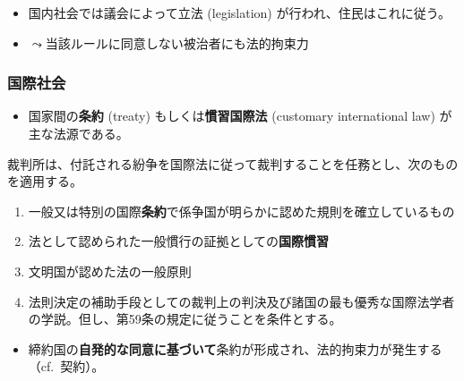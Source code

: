 \documentclass[
  xelatex,
  ja=standard]{bxjsarticle}
\providecommand{\tightlist}{%
  \setlength{\itemsep}{0pt}\setlength{\parskip}{0pt}}\usepackage{longtable,booktabs,array}
\begin{document}
\begin{itemize}
\tightlist
\item
  国内社会では議会によって立法 (legislation)
  が行われ、住民はこれに従う。
\item
  \(\leadsto\)当該ルールに同意しない被治者にも法的拘束力
\end{itemize}

\hypertarget{ux56fdux969bux793eux4f1a}{%
\subsubsection{国際社会}\label{ux56fdux969bux793eux4f1a}}

\begin{itemize}
\tightlist
\item
  国家間の\textbf{条約} (treaty) もしくは\textbf{慣習国際法} (customary
  international law) が主な法源である。
\end{itemize}

\begin{tcolorbox}[enhanced jigsaw, titlerule=0mm, leftrule=.75mm, toprule=.15mm, title=\textcolor{quarto-callout-note-color}{\faInfo}\hspace{0.5em}{\href{https://www.unic.or.jp/info/un/un_organization/icj/statute/}{国際司法裁判所規程}　第38条1項}, left=2mm, colbacktitle=quarto-callout-note-color!10!white, rightrule=.15mm, opacitybacktitle=0.6, colframe=quarto-callout-note-color-frame, breakable, coltitle=black, opacityback=0, bottomrule=.15mm, colback=white, bottomtitle=1mm, toptitle=1mm, arc=.35mm]

裁判所は、付託される紛争を国際法に従って裁判することを任務とし、次のものを適用する。

\begin{enumerate}
\def\labelenumi{\alph{enumi}.}
\tightlist
\item
  一般又は特別の国際\textbf{条約}で係争国が明らかに認めた規則を確立しているもの
\item
  法として認められた一般慣行の証拠としての\textbf{国際慣習}
\item
  文明国が認めた法の一般原則
\item
  法則決定の補助手段としての裁判上の判決及び諸国の最も優秀な国際法学者の学説。但し、第59条の規定に従うことを条件とする。
\end{enumerate}

\end{tcolorbox}

\begin{itemize}
\tightlist
\item
  締約国の\textbf{自発的な同意に基づいて}条約が形成され、法的拘束力が発生する（cf.~契約）。
\end{itemize}
\end{document}
